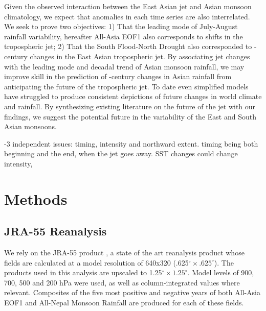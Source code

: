 	 
	Given the observed interaction between the East Asian jet and Asian monsoon climatology, we expect that anomalies in each time series are also interrelated. We seek to prove two objectives: 1) That the leading mode of July-August rainfall variability, hereafter All-Asia EOF1 \citep{Day2015} also corresponds to shifts in the tropospheric jet; 2) That the South Flood-North Drought also corresponded to -century changes in the East Asian tropospheric jet. By associating jet changes with the leading mode and decadal trend of Asian monsoon rainfall, we may improve skill in the prediction of -century changes in Asian rainfall from anticipating the future of the tropospheric jet. To date even simplified models have struggled to produce consistent depictions of future changes in world climate and rainfall. By synthesizing existing literature on the future of the jet with our findings, we suggest the potential future in the variability of the East and South Asian monsoons.
	  
	-3 independent issues: timing, intensity and northward extent. timing being both beginning and the end, when the jet goes away. SST changes could change intensity, 
	
\section{Methods}

\subsection{JRA-55 Reanalysis}

	We rely on the JRA-55 product  , a state of the art reanalysis product whose fields are calculated at a model resolution of 640x320 (.625$^{\circ} \times .625^{\circ}$). The products used in this analysis are upscaled to 1.25$^{\circ} \times 1.25^{\circ}$. Model levels of 900, 700, 500 and 200 hPa were used, as well as column-integrated values where relevant. Composites of the five most positive and negative years of both All-Asia EOF1 and All-Nepal Monsoon Rainfall are produced for each of these fields. 
	
